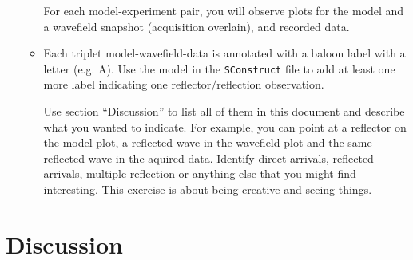 \begin{enumerate}
\begin{itemize}
For each model-experiment pair, you will observe
plots for the model and a wavefield snapshot (acquisition overlain),
and recorded data.

\item Each triplet model-wavefield-data is annotated with a baloon
label with a letter (e.g. A). Use the model in the 
\texttt{SConstruct} file to add at least one more label 
indicating one reflector/reflection observation.

Use section ``Discussion''
to list all of them in this document and describe what you 
wanted to indicate. For example, you can point at 
a reflector on the model plot,
a reflected wave in the wavefield plot and
the same reflected wave in the aquired data.
Identify direct arrivals, reflected arrivals, multiple reflection or 
anything else that you might find interesting.
This exercise is about being creative and seeing things.
\end{itemize}

\end{enumerate}



\section{Discussion}

